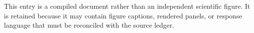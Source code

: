 This entry is a compiled document rather than an independent scientific figure. It is retained because it may contain figure captions, rendered panels, or response language that must be reconciled with the source ledger.
